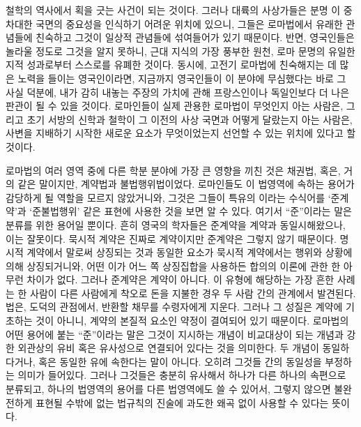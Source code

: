 철학의 역사에서 획을 긋는 사건이 되는 것이다.
그러나 대륙의 사상가들은
분명 이 중차대한 국면의 중요성을 인식하기 어려운 위치에 있으니,
그들은 로마법에서 유래한 관념들에 친숙하고
그것이 일상적 관념들에 섞여들어가 있기 때문이다.
반면, 영국인들은 놀라울 정도로 그것을 알지 못하니,
근대 지식의 가장 풍부한 원천,
로마 문명의 유일한 지적 성과로부터 스스로를 유폐한 것이다.
동시에,
고전기 로마법에 친숙해지는 데 많은 노력을 들이는
영국인이라면,
지금까지 영국인들이 이 분야에 무심했다는 바로 그 사실 덕분에,
내가 감히 내놓는 주장의 가치에 관해
프랑스인이나 독일인보다
더 나은 판관이 될 수 있을 것이다.
로마인들이 실제 관용한 로마법이 무엇인지 아는 사람은,
그리고 초기 서방의 신학과 철학이 그 이전의 사상 국면과 어떻게
달랐는지 아는 사람은,
사변을 지배하기 시작한 새로운 요소가 무엇이었는지
선언할 수 있는 위치에 있다고 할 것이다.

로마법의 여러 영역 중에 다른 학분 분야에 가장 큰 영향을 끼친 것은
채권법, 혹은, 거의 같은 말이지만, 계약법과 불법행위법이었다.
로마인들도
이 법영역에 속하는 용어가 감당하게 될 역할을 모르지 않았거니와,
그것은 그들이 특유의 이라는
수식어를 `준계약'과
`준불법행위' 같은 표현에 사용한 것을 보면 알 수 있다.
여기서 ``준''이라는 말은 분류를 위한 용어일 뿐이다.
흔히 영국의 학자들은 준계약을  계약과 동일시해왔으나,
이는 잘못이다.
묵시적 계약은 진짜로 계약이지만 준계약은 그렇지 않기 때문이다.
명시적 계약에서 말로써 상징되는 것과 동일한 요소가
묵시적 계약에서는 행위와 상황에 의해 상징되거니와,
어떤 이가
어느 쪽 상징집합을 사용하든
합의의 이론에 관한 한
아무런 차이가 없다.
그러나 준계약은 계약이 아니다.
이 유형에 해당하는 가장 흔한 사례는
한 사람이 다른 사람에게 착오로 돈을 지불한 경우 두 사람 간의 관계에서 발견된다.
법은, 도덕의 관점에서,
반환할 채무를 수령자에게 지운다.
그러나 그 성질은 계약에 기초하는 것이 아니니,
계약의 본질적 요소인 약정이 결여되어 있기 때문이다.
로마법의 어떤 용어에 붙는
``준''이라는 말은 그것이 지시하는 개념이
비교대상이 되는 개념과 강한 외관상의 유비 혹은 유사성으로
연결되어 있다는 것을 의미한다.
두 개념이 동일하다거나, 혹은 동일한 유에 속한다는 말이 아니다.
오히려
그것들 간의 동일성을 부정하는 의미가 들어있다.
그러나 그것들은 충분히 유사해서
하나가 다른 하나의 속편으로
분류되고,
하나의 법영역의 용어를 다른 법영역에도 쓸 수 있어서,
그렇지 않으면 불완전하게 표현될 수밖에 없는 법규칙의 진술에
과도한 왜곡 없이 사용할 수 있다는 뜻이다.

